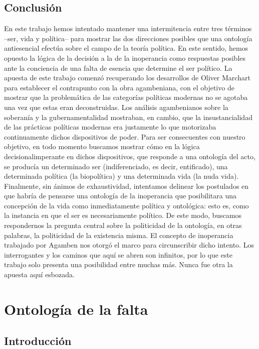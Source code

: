 \section{Conclusión}

En este trabajo hemos intentado mantener una intermitencia entre tres
términos --ser, vida y política-- para mostrar las dos direcciones
posibles que una ontología antiesencial efectúa sobre el campo de la
teoría política. En este sentido, hemos opuesto la lógica de la decisión
a la de la inoperancia como respuestas posibles ante la conciencia de
una falta de esencia que determine el ser político. La apuesta de este
trabajo comenzó recuperando los desarrollos de Oliver Marchart para
establecer el contrapunto con la obra agambeniana, con el objetivo de
mostrar que la problemática de las categorías políticas modernas no se
agotaba una vez que estas eran deconstruidas. Los análisis agambenianos
sobre la soberanía y la gubernamentalidad mostraban, en cambio, que la
insustancialidad de las prácticas políticas modernas era justamente lo
que motorizaba continuamente dichos dispositivos de poder. Para ser
consecuentes con nuestro objetivo, en todo momento buscamos mostrar cómo
en la lógica decisionalimperante en dichos dispositivos, que responde a
una ontología del acto, se producía un determinado ser (indiferenciado,
es decir, entificado), una determinada política (la biopolítica) y una
determinada vida (la nuda vida). Finalmente, sin ánimos de
exhaustividad, intentamos delinear los postulados en que habría de
pensarse una ontología de la inoperancia que posibilitara una concepción
de la vida como inmediatamente política y ontológica: esto es, como la
instancia en que el ser es necesariamente político. De este modo,
buscamos respondernos la pregunta central sobre la politicidad de la
ontología, en otras palabras, la politicidad de la existencia misma. El
concepto de inoperancia trabajado por Agamben nos otorgó el marco para
circunscribir dicho intento. Los interrogantes y los caminos que aquí se
abren son infinitos, por lo que este trabajo solo presenta una
posibilidad entre muchas más. Nunca fue otra la apuesta aquí esbozada.

\chapter{Ontología de la falta}

\section{Introducción}

